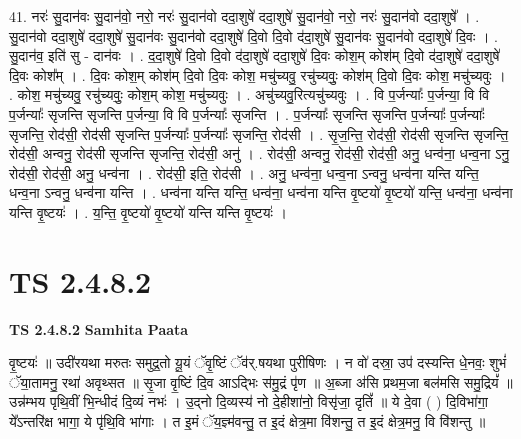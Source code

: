 \documentclass[17pt]{extarticle}
\begin{document}
41. नरः॑ सु॒दान॑वः सु॒दान॑वो॒ नरो॒ नरः॑ सु॒दान॑वो ददा॒शुषे॑ ददा॒शुषे॑ सु॒दान॑वो॒ नरो॒ नरः॑ सु॒दान॑वो ददा॒शुषे᳚ । . सु॒दान॑वो ददा॒शुषे॑ ददा॒शुषे॑ सु॒दान॑वः सु॒दान॑वो ददा॒शुषे॑ दि॒वो दि॒वो द॑दा॒शुषे॑ सु॒दान॑वः सु॒दान॑वो ददा॒शुषे॑ दि॒वः । . सु॒दान॑व॒ इति॑ सु - दान॑वः । . द॒दा॒शुषे॑ दि॒वो दि॒वो द॑दा॒शुषे॑ ददा॒शुषे॑ दि॒वः कोश॒म् कोश॑म् दि॒वो द॑दा॒शुषे॑ ददा॒शुषे॑ दि॒वः कोश᳚म् । . दि॒वः कोश॒म् कोश॑म् दि॒वो दि॒वः कोश॒ मचु॑च्यवु॒ रचु॑च्यवुः॒ कोश॑म् दि॒वो दि॒वः कोश॒ मचु॑च्यवुः । . कोश॒ मचु॑च्यवु॒ रचु॑च्यवुः॒ कोश॒म् कोश॒ मचु॑च्यवुः । . अचु॑च्यवु॒रित्यचु॑च्यवुः । . वि प॒र्जन्याः᳚ प॒र्जन्या॒ वि वि प॒र्जन्याः᳚ सृजन्ति सृजन्ति प॒र्जन्या॒ वि वि प॒र्जन्याः᳚ सृजन्ति । . प॒र्जन्याः᳚ सृजन्ति सृजन्ति प॒र्जन्याः᳚ प॒र्जन्याः᳚ सृजन्ति॒ रोद॑सी॒ रोद॑सी सृजन्ति प॒र्जन्याः᳚ प॒र्जन्याः᳚ सृजन्ति॒ रोद॑सी । . सृ॒ज॒न्ति॒ रोद॑सी॒ रोद॑सी सृजन्ति सृजन्ति॒ रोद॑सी॒ अन्वनु॒ रोद॑सी सृजन्ति सृजन्ति॒ रोद॑सी॒ अनु॑ । . रोद॑सी॒ अन्वनु॒ रोद॑सी॒ रोद॑सी॒ अनु॒ धन्व॑ना॒ धन्व॒ना ऽनु॒ रोद॑सी॒ रोद॑सी॒ अनु॒ धन्व॑ना । . रोद॑सी॒ इति॒ रोद॑सी । . अनु॒ धन्व॑ना॒ धन्व॒ना ऽन्वनु॒ धन्व॑ना यन्ति यन्ति॒ धन्व॒ना ऽन्वनु॒ धन्व॑ना यन्ति । . धन्व॑ना यन्ति यन्ति॒ धन्व॑ना॒ धन्व॑ना यन्ति वृ॒ष्टयो॑ वृ॒ष्टयो॑ यन्ति॒ धन्व॑ना॒ धन्व॑ना यन्ति वृ॒ष्टयः॑ । . य॒न्ति॒ वृ॒ष्टयो॑ वृ॒ष्टयो॑ यन्ति यन्ति वृ॒ष्टयः॑ । \newline
\pagebreak
{}
\section*{ TS 2.4.8.2 }

\textbf{TS 2.4.8.2 } \newline
\textbf{Samhita Paata} \newline

वृ॒ष्टयः॑ ॥ उदी॑रयथा मरुतः समुद्र॒तो यू॒यं ॅवृ॒ष्टिं ॅव॑र्.षयथा पुरीषिणः । न वो॑ दस्रा॒ उप॑ दस्यन्ति धे॒नवः॒ शुभं॑ ॅया॒तामनु॒ रथा॑ अवृथ्सत ॥ सृ॒जा वृ॒ष्टिं दि॒व आऽद्भिः स॑मु॒द्रं पृ॑ण ॥ अ॒ब्जा अ॑सि प्रथम॒जा बल॑मसि समु॒द्रियं᳚ ॥ उन्न॑म्भय पृथि॒वीं भि॒न्धीदं दि॒व्यं नभः॑ । उ॒द्नो दि॒व्यस्य॑ नो दे॒हीशा॑नो॒ विसृ॑जा॒ दृतिं᳚ ॥ ये दे॒वा ( ) दि॒विभा॑गा॒ ये᳚ऽन्तरि॑क्ष भागा॒ ये पृ॑थि॒वि भा॑गाः । त इ॒मं ॅय॒ज्ञ्म॑वन्तु॒ त इ॒दं क्षेत्र॒मा वि॑शन्तु॒ त इ॒दं क्षेत्र॒मनु॒ वि वि॑शन्तु ॥ \newline
\end{document}
